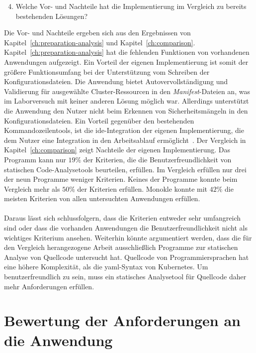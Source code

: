 \begin{enumerate}
  \setcounter{enumi}{3}
  \item Welche Vor- und Nachteile hat die Implementierung im Vergleich zu bereits bestehenden Lösungen?
\end{enumerate}

Die Vor- und Nachteile ergeben sich aus den Ergebnissen von Kapitel~\ref{ch:preparation-analysis} und Kapitel~\ref{ch:comparison}.
Kapitel~\ref{ch:preparation-analysis} hat die fehlenden Funktionen von vorhandenen Anwendungen aufgezeigt. Ein Vorteil der eigenen Implementierung ist
somit der größere Funktionsumfang bei der Unterstützung vom Schreiben der Konfigurationsdateien.
Die Anwendung bietet Autovervollständigung und Validierung für ausgewählte Cluster-Ressourcen in den \textit{Manifest}-Dateien an, was im Laborversuch
mit keiner anderen Lösung möglich war. Allerdings unterstützt die Anwendung den Nutzer nicht beim Erkennen von Sicherheitsmängeln in
den Konfigurationsdateien. Ein Vorteil gegenüber den bestehenden
Kommandozeilentools, ist die \ac{ide}-Integration der eigenen Implementierung, die dem Nutzer eine Integration in den Arbeitsablauf ermöglicht~\cite{usability-criteria-static-analysis-tools}.
Der Vergleich in Kapitel~\ref{ch:comparison} zeigt Nachteile der eigenen Implementierung. Das Programm kann nur $19\%$ der Kriterien, die die
Benutzerfreundlichkeit von statischen Code-Analysetools beurteilen, erfüllen. Im Vergleich erfüllen nur drei der neun Programme weniger Kriterien.
Keines der Programme konnte beim Vergleich mehr als $50\%$ der Kriterien erfüllen.
Monokle konnte mit $42\%$ die meisten Kriterien von allen untersuchten Anwendungen erfüllen.
\\\\
Daraus lässt sich schlussfolgern, dass die Kriterien entweder sehr umfangreich sind oder dass die vorhanden Anwendungen
die Benutzerfreundlichkeit nicht als wichtiges Kriterium ansehen.
Weiterhin könnte argumentiert werden, dass die für den Vergleich herangezogene Arbeit ausschließlich Programme zur statischen Analyse
von Quellcode untersucht hat. Quellcode von Programmiersprachen hat eine höhere Komplexität, als die \ac{yaml}-Syntax von Kubernetes.
Um benutzerfreundlich zu sein, muss ein statisches Analysetool für Quellcode daher mehr Anforderungen erfüllen.

\section{Bewertung der Anforderungen an die Anwendung}

